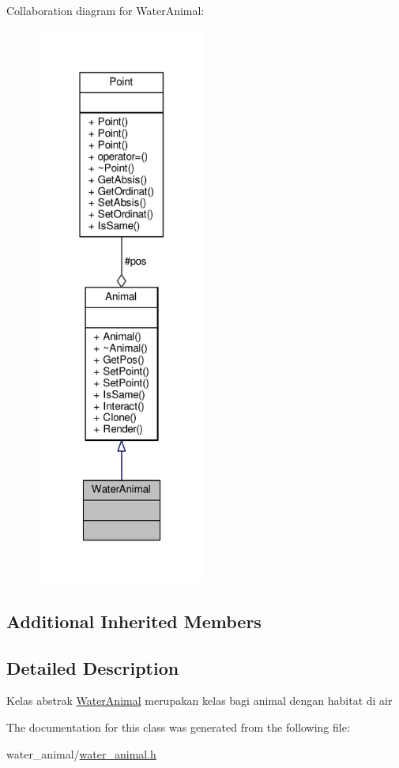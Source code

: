 Collaboration diagram for Water\+Animal\+:
\nopagebreak
\begin{figure}[H]
\begin{center}
\leavevmode
\includegraphics[width=159pt]{classWaterAnimal__coll__graph}
\end{center}
\end{figure}
\subsection*{Additional Inherited Members}


\subsection{Detailed Description}
Kelas abstrak \hyperlink{classWaterAnimal}{Water\+Animal} merupakan kelas bagi animal dengan habitat di air 

The documentation for this class was generated from the following file\+:\begin{DoxyCompactItemize}
\item 
water\+\_\+animal/\hyperlink{water__animal_8h}{water\+\_\+animal.\+h}\end{DoxyCompactItemize}
